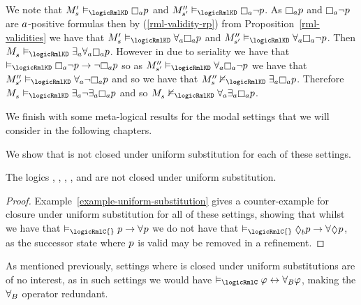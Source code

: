 \begin{example}
We note that $\kPModelP{\kStateS} \entails_\logicRmlKD\necessaryA \atomP$ and $\kPModelPP{\kStateSP} \entails_\logicRmlKD\necessaryA \lnot \atomP$.
As $\necessaryA \atomP$ and $\necessaryA \lnot \atomP$ are $a$-positive formulas then by (\ref{rml-validity-rp}) from Proposition~\ref{rml-validities} we have that $\kPModelP{\kStateS} \entails_\logicRmlKD\allrefsA \necessaryA \atomP$ and $\kPModelPP{\kStateSP} \entails_\logicRmlKD\allrefsA \necessaryA \lnot \atomP$.
Then $\kPModel{\kStateS} \entails_\logicRmlKD\somerefsA \allrefsA \necessaryA \atomP$.
However in \classKD{} due to seriality we have that $\entails_\logicRmlKD\necessaryA \lnot \atomP \implies \lnot \necessaryA \atomP$ so as $\kPModelPP{\kStateSP} \entails_\logicRmlKD\allrefsA \necessaryA \lnot \atomP$ we have that $\kPModelPP{\kStateSP} \entails_\logicRmlKD\allrefsA \lnot \necessaryA \atomP$ and so we have that $\kPModelPP{\kStateS} \nentails_\logicRmlKD\somerefsA \necessaryA \atomP$.
Therefore $\kPModel{\kStateS} \entails_\logicRmlKD\somerefsA \lnot \somerefsA \necessaryA \atomP$ and so $\kPModel{\kStateS} \nentails_\logicRmlKD\allrefsA \somerefsA \necessaryA \atomP$.
\end{example}

We finish with some meta-logical results for the modal settings that we will consider in the following chapters.

We show that \logicRml{} is not closed under uniform substitution for each of these settings.

\begin{proposition}
The logics \logicRmlK{}, \logicRmlKF{}, \logicRmlKFF{}, \logicRmlKD{}, \logicRmlSF{} and \logicRmlS{} are not closed under uniform substitution.
\end{proposition}

\begin{proof}
Example~\ref{example-uniform-substitution} gives a counter-example for closure under uniform substitution for all of these settings, showing that whilst we have that $\entails_\logicRmlC{} \atomP \implies \allrefs \atomP$ we do not have that $\entails_\logicRmlC{} \possibleB \atomP \implies \allrefs \possible \atomP$, as the successor state where $p$ is valid may be removed in a refinement.
\end{proof}

As mentioned previously, settings where \logicRml{} is closed under uniform substitutions are of no interest, as in such settings we would have $\entails_\logicRmlC \phi \iff \allrefsBs \phi$, making the ${\forall_{B}}$ operator redundant.

